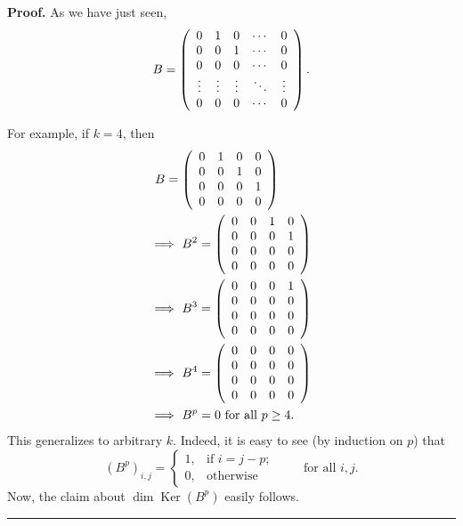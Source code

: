 \documentclass[numbers=enddot,12pt,final,onecolumn,notitlepage]{scrartcl}%
\numberwithin{exer}{subsection}
\theoremstyle{definition}
\newenvironment{proof}[1][Proof]{\noindent\textbf{#1.} }{\ \rule{0.5em}{0.5em}}
\begin{document}
\begin{proof}
As we have just seen,%
\[
B=\left(
\begin{array}
[c]{ccccc}%
0 & 1 & 0 & \cdots & 0\\
0 & 0 & 1 & \cdots & 0\\
0 & 0 & 0 & \cdots & 0\\
\vdots & \vdots & \vdots & \ddots & \vdots\\
0 & 0 & 0 & \cdots & 0
\end{array}
\right)  .
\]


For example, if $k=4$, then%
\begin{align*}
& \ B=\left(
\begin{array}
[c]{cccc}%
0 & 1 & 0 & 0\\
0 & 0 & 1 & 0\\
0 & 0 & 0 & 1\\
0 & 0 & 0 & 0
\end{array}
\right)  \\
& \Longrightarrow\ B^{2}=\left(
\begin{array}
[c]{cccc}%
0 & 0 & 1 & 0\\
0 & 0 & 0 & 1\\
0 & 0 & 0 & 0\\
0 & 0 & 0 & 0
\end{array}
\right)  \\
& \Longrightarrow\ B^{3}=\left(
\begin{array}
[c]{cccc}%
0 & 0 & 0 & 1\\
0 & 0 & 0 & 0\\
0 & 0 & 0 & 0\\
0 & 0 & 0 & 0
\end{array}
\right)  \\
& \Longrightarrow\ B^{4}=\left(
\begin{array}
[c]{cccc}%
0 & 0 & 0 & 0\\
0 & 0 & 0 & 0\\
0 & 0 & 0 & 0\\
0 & 0 & 0 & 0
\end{array}
\right)  \\
& \Longrightarrow\ B^{p}=0\text{ for all }p\geq4.
\end{align*}
This generalizes to arbitrary $k$. Indeed, it is easy to see (by induction on
$p$) that
\[
\left(  B^{p}\right)  _{i,j}=%
\begin{cases}
1, & \text{if }i=j-p;\\
0, & \text{otherwise}%
\end{cases}
\ \ \ \ \ \ \ \ \ \ \text{for all }i,j.
\]
Now, the claim about $\dim\operatorname*{Ker}\left(  B^{p}\right)  $ easily follows.
\end{proof}
\end{document}
